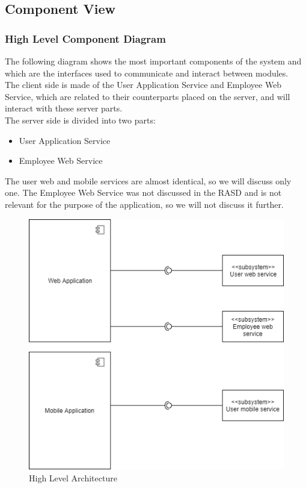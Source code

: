 \documentclass{article}
\begin{document}
		\subsection{Component View}
			\subsubsection{High Level Component Diagram}
The following diagram shows the most important components of the system and which are the interfaces used to communicate and interact between modules.\\
The client side is made of the User Application Service and Employee Web Service, which are related to their counterparts placed on the server, and will interact with these server parts.\\
The server side is divided into two parts:
				\begin{itemize}
				\item{} User Application Service
				\item{} Employee Web Service
				\end{itemize}
The user web and mobile services are almost identical, so we will discuss only one. The Employee Web Service was not discussed in the RASD and is not relevant for the purpose of the application, so we will not discuss it further.
				\begin{figure}[H]
				\includegraphics[width=\linewidth]{Images/Architecture/High-Level_Architecture.png}
				\caption{High Level Architecture}
				\label{fig:HLA}
				\end{figure}
\end{document}
